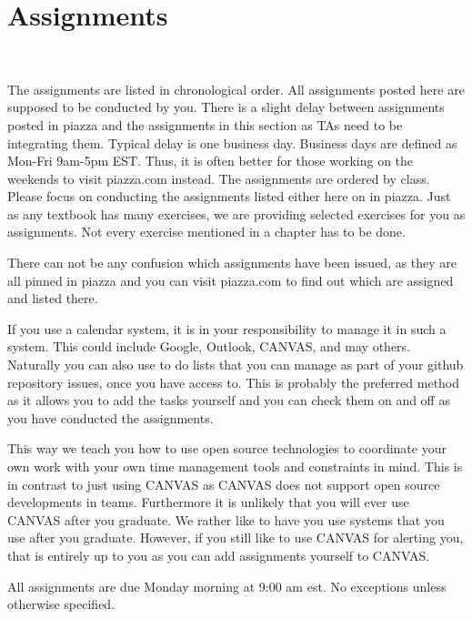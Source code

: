 
\chapter{Assignments}
\label{c:assignments}

\FILENAME\

The assignments are listed in chronological order. All assignments
posted here are supposed to be conducted by you. There is a slight
delay between assignments posted in piazza and the assignments in this
section as TAs need to be integrating them. Typical delay is one
business day. Business days are defined as Mon-Fri 9am-5pm
EST. Thus, it is often better for those working on the weekends to
visit piazza.com instead. The assignments are ordered by class. Please
focus on conducting the assignments listed either here on in
piazza. Just as any textbook has many exercises, we are providing
selected exercises for you as assignments. Not every exercise
mentioned in a chapter has to be done.

\begin{IU}
  There can not be any confusion which assignments have been issued,
  as they are all pinned in piazza and you can visit piazza.com to
  find out which are assigned and listed there.
\end{IU}

If you use a calendar system, it is in your responsibility
to manage it in such a system. This could include Google, Outlook,
CANVAS, and may others. Naturally you can also use to do lists that
you can manage as part of your github repository issues, once you have
access to. This is probably the preferred method as it allows you to
add the tasks yourself and you can check them on and off as you have
conducted the assignments. 

This way we teach you how to use open source technologies to
coordinate your own work with your own time management tools and
constraints in mind. This is in contrast to just using CANVAS as
CANVAS does not support open source developments in teams. Furthermore
it is unlikely that you will ever use CANVAS after you graduate. We
rather like to have you use systems that you use after you graduate.
However, if you still like to use CANVAS for alerting you, that is
entirely up to you as you can add assignments yourself to CANVAS. 

\smallskip

\begin{IU}
  All assignments are due Monday morning at 9:00 am est. No exceptions
  unless otherwise specified.
\end{IU}

